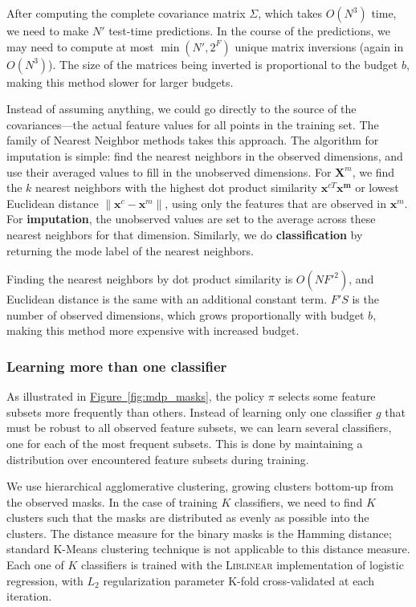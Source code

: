 After computing the complete covariance matrix $\Sigma$, which takes $O(N^3)$ time, we need to make $N'$ test-time predictions.
In the course of the predictions, we may need to compute at most $\min(N', 2^F)$ unique matrix inversions (again in $O(N^3)$).
The size of the matrices being inverted is proportional to the budget $b$, making this method slower for larger budgets.

Instead of assuming anything, we could go directly to the source of the covariances---the actual feature values for all points in the training set.
The family of Nearest Neighbor methods takes this approach.
The algorithm for imputation is simple: find the nearest neighbors in the observed dimensions, and use their averaged values to fill in the unobserved dimensions.
For $\mathbf{X}^m$, we find the $k$ nearest neighbors with the highest dot product similarity $\mathbf{x}^{cT} \mathbf{x^m}$ or lowest Euclidean distance $\| \mathbf{x}^{c} - \mathbf{x}^{m} \|$, using only the features that are observed in $\mathbf{x}^{m}$.
For \textbf{imputation}, the unobserved values are set to the average across these nearest neighbors for that dimension.
Similarly, we do \textbf{classification} by returning the mode label of the nearest neighbors.

Finding the nearest neighbors by dot product similarity is $O(NF'^2)$, and Euclidean distance is the same with an additional constant term.
$F'S$ is the number of observed dimensions, which grows proportionally with budget $b$, making this method more expensive with increased budget.

\subsubsection{Learning more than one classifier}



As illustrated in \hyperref[fig:mdp_masks]{Figure~\ref*{fig:mdp_masks}}, the policy $\pi$ selects some feature subsets more frequently than others.
Instead of learning only one classifier $g$ that must be robust to all observed feature subsets, we can learn several classifiers, one for each of the most frequent subsets.
This is done by maintaining a distribution over encountered feature subsets during training.

We use hierarchical agglomerative clustering, growing clusters bottom-up from the observed masks.
In the case of training $K$ classifiers, we need to find $K$ clusters such that the masks are distributed as evenly as possible into the clusters.
The distance measure for the binary masks is the Hamming distance; standard K-Means clustering technique is not applicable to this distance measure.
Each one of $K$ classifiers is trained with the \textsc{Liblinear} implementation of logistic regression, with $L_2$ regularization parameter K-fold cross-validated at each iteration.
